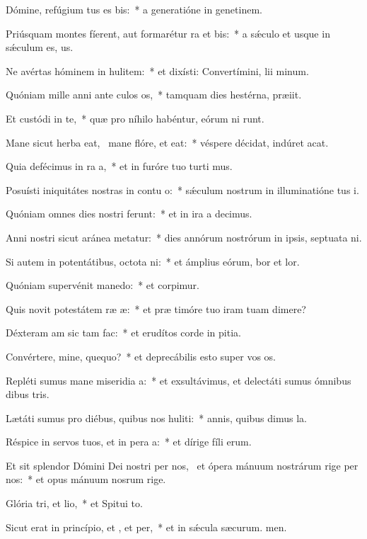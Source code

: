 \item Dómine, refúgium tus es bis:~* a generatióne in genetinem.
\item Priúsquam montes fíerent, aut formarétur ra et bis:~* a sǽculo et usque in sǽculum  es, us.
\item Ne avértas hóminem in hulitem:~* et dixísti: Convertímini, lii minum.
\item Quóniam mille anni ante culos os,~* tamquam dies hestérna,  præiit.
\item Et custódi in te,~* quæ pro níhilo habéntur, eórum ni runt.
\item Mane sicut herba eat,~\pscross{} mane flóre, et eat:~* véspere décidat, indúret  acat.
\item Quia defécimus in ra a,~* et in furóre tuo turti mus.
\item Posuísti iniquitátes nostras in contu o:~* sǽculum nostrum in illuminatióne tus i.
\item Quóniam omnes dies nostri ferunt:~* et in ira a decimus.
\item Anni nostri sicut aránea metatur:~* dies annórum nostrórum in ipsis, septuata ni.
\item Si autem in potentátibus, octota ni:~* et ámplius eórum, bor et lor.
\item Quóniam supervénit manedo:~* et corpimur.
\item Quis novit potestátem ræ æ:~* et præ timóre tuo iram tuam dimere?
\item Déxteram am sic tam fac:~* et erudítos corde in pitia.
\item Convértere, mine, quequo?~* et deprecábilis esto super vos os.
\item Repléti sumus mane miseridia a:~* et exsultávimus, et delectáti sumus ómnibus dibus tris.
\item Lætáti sumus pro diébus, quibus nos huliti:~* annis, quibus dimus la.
\item Réspice in servos tuos, et in pera a:~* et dírige fíli erum.
\item Et sit splendor Dómini Dei nostri per nos,~\pscross{} et ópera mánuum nostrárum rige per nos:~* et opus mánuum nosrum rige.
\item Glória tri, et lio,~* et Spitui to.
\item Sicut erat in princípio, et , et per,~* et in sǽcula sæcurum. men.
